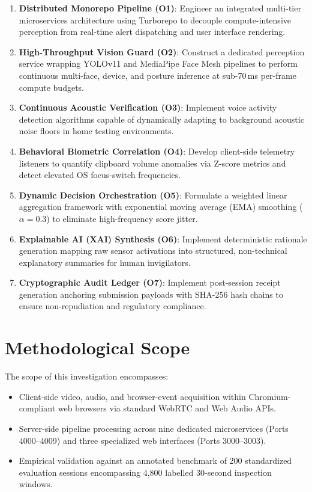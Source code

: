 \begin{enumerate}
    \item \textbf{Distributed Monorepo Pipeline (O1)}: Engineer an integrated multi-tier microservices architecture using Turborepo to decouple compute-intensive perception from real-time alert dispatching and user interface rendering.
    \item \textbf{High-Throughput Vision Guard (O2)}: Construct a dedicated perception service wrapping YOLOv11 and MediaPipe Face Mesh pipelines to perform continuous multi-face, device, and posture inference at sub-70\,ms per-frame compute budgets.
    \item \textbf{Continuous Acoustic Verification (O3)}: Implement voice activity detection algorithms capable of dynamically adapting to background acoustic noise floors in home testing environments.
    \item \textbf{Behavioral Biometric Correlation (O4)}: Develop client-side telemetry listeners to quantify clipboard volume anomalies via Z-score metrics and detect elevated OS focus-switch frequencies.
    \item \textbf{Dynamic Decision Orchestration (O5)}: Formulate a weighted linear aggregation framework with exponential moving average (EMA) smoothing ($\alpha = 0.3$) to eliminate high-frequency score jitter.
    \item \textbf{Explainable AI (XAI) Synthesis (O6)}: Implement deterministic rationale generation mapping raw sensor activations into structured, non-technical explanatory summaries for human invigilators.
    \item \textbf{Cryptographic Audit Ledger (O7)}: Implement post-session receipt generation anchoring submission payloads with SHA-256 hash chains to ensure non-repudiation and regulatory compliance.
\end{enumerate}

\section{Methodological Scope}

The scope of this investigation encompasses:
\begin{itemize}
    \item Client-side video, audio, and browser-event acquisition within Chromium-compliant web browsers via standard WebRTC and Web Audio APIs.
    \item Server-side pipeline processing across nine dedicated microservices (Ports 4000--4009) and three specialized web interfaces (Ports 3000--3003).
    \item Empirical validation against an annotated benchmark of 200 standardized evaluation sessions encompassing 4,800 labelled 30-second inspection windows.
\end{itemize}

